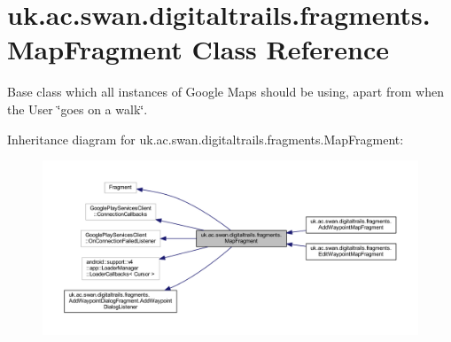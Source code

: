 \hypertarget{classuk_1_1ac_1_1swan_1_1digitaltrails_1_1fragments_1_1_map_fragment}{\section{uk.\+ac.\+swan.\+digitaltrails.\+fragments.\+Map\+Fragment Class Reference}
\label{classuk_1_1ac_1_1swan_1_1digitaltrails_1_1fragments_1_1_map_fragment}
}


Base class which all instances of Google Maps should be using, apart from when the User \char`\"{}goes on a walk\char`\"{}.  




Inheritance diagram for uk.\+ac.\+swan.\+digitaltrails.\+fragments.\+Map\+Fragment\+:\nopagebreak
\begin{figure}[H]
\begin{center}
\leavevmode
\includegraphics[width=350pt]{classuk_1_1ac_1_1swan_1_1digitaltrails_1_1fragments_1_1_map_fragment__inherit__graph}
\end{center}
\end{figure}


